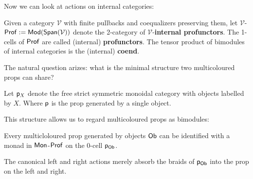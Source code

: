 Now we can look at actions on internal categories:

\begin{definition}
Given a category $\mathcal V$ with finite pullbacks and coequalizers preserving them, let $\mathcal V$-$\Prof:=\Mod(\Span(\mathcal V))$ denote the 2-category of $\mathcal V$-{\bf internal profunctors}.  
The 1-cells of $\Prof$ are called (internal) {\bf  profunctors}.
The tensor product of bimodules of internal categories is the (internal) {\bf coend}.
\end{definition}

The natural question arizes:  what is the minimal structure two multicoloured props can share?

\begin{definition}
Let $\P_X$ denote the free strict symmetric monoidal category with objects labelled by $X$. Where $\P$ is the prop generated by a single object.
\end{definition}


This structure allows us to regard multicoloured props as bimodules:


\begin{lemma}[{\cite[???]{??}}]
Every multicloloured prop generated by objects $\sf Ob$ can be identified with a monad in $\Mon$-$\Prof$ on the $0$-cell $\P_{\sf Ob}$.  
\end{lemma}

The canonical left and right actions merely absorb the braids of $\P_{\sf Ob}$ into the prop on the left and right.



